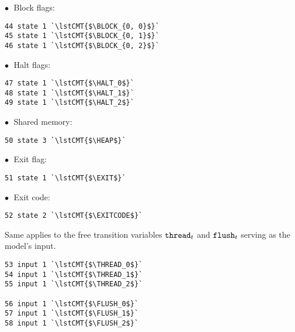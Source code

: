 \noindent
$\bullet \;$ Block flags: %
\begin{lstlisting}[style=btor2]
44 state 1 `\lstCMT{$\BLOCK_{0, 0}$}`
45 state 1 `\lstCMT{$\BLOCK_{0, 1}$}`
46 state 1 `\lstCMT{$\BLOCK_{0, 2}$}`
\end{lstlisting}

\noindent
$\bullet \;$ Halt flags: %
\begin{lstlisting}[style=btor2]
47 state 1 `\lstCMT{$\HALT_0$}`
48 state 1 `\lstCMT{$\HALT_1$}`
49 state 1 `\lstCMT{$\HALT_2$}`
\end{lstlisting}

\noindent
$\bullet \;$ Shared memory: %
\begin{lstlisting}[style=btor2]
50 state 3 `\lstCMT{$\HEAP$}`
\end{lstlisting}

\noindent
$\bullet \;$ Exit flag: %
\begin{lstlisting}[style=btor2]
51 state 1 `\lstCMT{$\EXIT$}`
\end{lstlisting}

\noindent
$\bullet \;$ Exit code: %
\begin{lstlisting}[style=btor2]
52 state 2 `\lstCMT{$\EXITCODE$}`
\end{lstlisting}

\noindent
Same applies to the free transition variables $\texttt{thread}_t$ and $\texttt{flush}_t$ serving as the model's input.
\begin{lstlisting}[style=btor2]
53 input 1 `\lstCMT{$\THREAD_0$}`
54 input 1 `\lstCMT{$\THREAD_1$}`
55 input 1 `\lstCMT{$\THREAD_2$}`

56 input 1 `\lstCMT{$\FLUSH_0$}`
57 input 1 `\lstCMT{$\FLUSH_1$}`
58 input 1 `\lstCMT{$\FLUSH_2$}`
\end{lstlisting}

